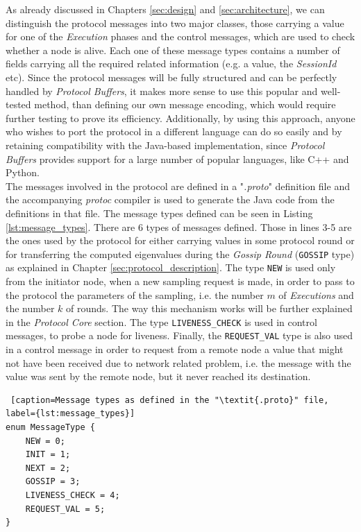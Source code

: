 \documentclass[a4paper,11pt,twoside]{report}
\newcommand{\classname}[1]{\texttt{#1}}
\begin{document}
As already discussed in Chapters \ref{sec:design} and \ref{sec:architecture}, we can distinguish the protocol messages into two major classes, those carrying a value for one of the \textit{Execution} phases and the control messages, which are used to check whether a node is alive. Each one of these message types contains a number of fields carrying all the required related information (e.g. a value, the \textit{SessionId} etc). Since the protocol messages will be fully structured and can be perfectly handled by \textit{Protocol Buffers}, it makes more sense to use this popular and well-tested method, than defining our own message encoding, which would require further testing to prove its efficiency. Additionally, by using this approach, anyone who wishes to port the protocol in a different language can do so easily and by retaining compatibility with the Java-based implementation, since \textit{Protocol Buffers} provides support for a large number of popular languages, like C++ and Python. \\

The messages involved in the protocol are defined in a "\textit{.proto}" definition file and the accompanying \textit{protoc} compiler is used to generate the Java code from the definitions in that file. The message types defined can be seen in Listing \ref{lst:message_types}. There are 6 types of messages defined. Those in lines 3-5 are the ones used by the protocol for either carrying values in some protocol round or for transferring the computed eigenvalues during the \textit{Gossip Round} (\classname{GOSSIP} type) as explained in Chapter \ref{sec:protocol_description}. The type \classname{NEW} is used only from the initiator node, when a new sampling request is made, in order to pass to the protocol the parameters of the sampling, i.e. the number $m$ of \textit{Executions} and the number $k$ of rounds. The way this mechanism works will be further explained in the \textit{Protocol Core} section. The type \classname{LIVENESS\_CHECK} is used in control messages, to probe a node for liveness. Finally, the \classname{REQUEST\_VAL} type is also used in a control message in order to request from a remote node a value that might not have been received due to network related problem, i.e. the message with the value was sent by the remote node, but it never reached its destination.
 

\lstset{
 language = sh,
  numbers=left,
  stepnumber=1,    
  firstnumber=1,
  numberfirstline=true
}
\begin{lstlisting} [caption=Message types as defined in the "\textit{.proto}" file, label={lst:message_types}]
enum MessageType {
	NEW = 0;
	INIT = 1;
	NEXT = 2;
	GOSSIP = 3;
	LIVENESS_CHECK = 4;
	REQUEST_VAL = 5;
} 
\end{lstlisting}
\end{document}
